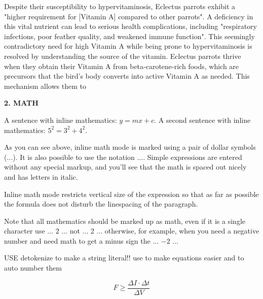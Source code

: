 \documentclass[twocolumn]{article} %
\begin{document}
Despite their susceptibility to hypervitaminosis, Eclectus parrots exhibit a "higher requirement for [Vitamin A] compared to other parrots". A deficiency in this vital nutrient can lead to serious health complications, including "respiratory infections, poor feather quality, and weakened immune function". This seemingly contradictory need for high Vitamin A while being prone to hypervitaminosis is resolved by understanding the source of the vitamin. Eclectus parrots thrive when they obtain their Vitamin A from beta-carotene-rich foods, which are precursors that the bird's body converts into active Vitamin A as needed. This mechanism allows them to

\newpage

\begin{center}
\textbf{2. MATH}
\end{center}

A sentence with inline mathematics: $y = mx + c$.
A second sentence with inline mathematics: $5^{2}=3^{2}+4^{2}$.

As you can see above, inline math mode is marked using a pair of dollar symbols ($...$). It is also possible to use the notation \( ... \). Simple expressions are entered without any special markup, and you’ll see that the math is spaced out nicely and has letters in italic.

Inline math mode restricts vertical size of the expression so that as far as possible the formula does not disturb the linespacing of the paragraph.

Note that all mathematics should be marked up as math, even if it is a single character use ... $2$ ... not ... 2 ... otherwise, for example, when you need a negative number and need math to get a minus sign the ... $-2$ ...

USE detokenize to make a string literal!!
use \detokenize{\begin{equation}} to make equations easier and to auto number them

{\Large
\begin{equation}
F \geq \frac{\Delta I \cdot \Delta t}{\Delta V}
\end{equation}
}
\end{document}
